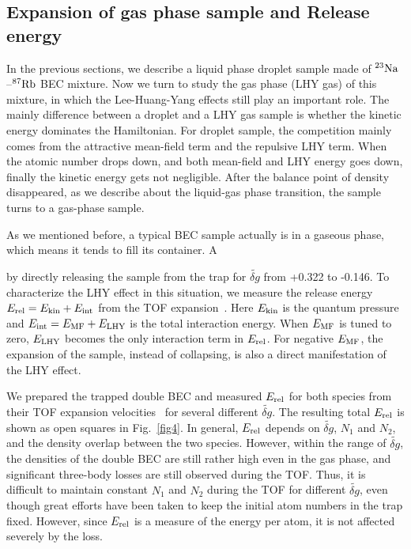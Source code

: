 \subsection{Expansion of gas phase sample and Release energy}
In the previous sections, we describe a liquid phase droplet sample made of $^{23}\rm Na$--$^{87}\rm Rb$ BEC mixture. 
Now we turn to study the gas phase (LHY gas) of this mixture, in which the Lee-Huang-Yang effects still play an important role.
The mainly difference between a droplet and a LHY gas sample is whether the kinetic energy dominates the Hamiltonian.
For droplet sample, the competition mainly comes from the attractive mean-field term and the repulsive LHY term.
When the atomic number drops down, and both mean-field and LHY energy goes down, finally the kinetic energy gets not negligible.
After the balance point of density disappeared, as we describe about the liquid-gas phase transition, the sample turns to a gas-phase sample.

As we mentioned before, a typical BEC sample actually is in a gaseous phase, which means it tends to fill its container.
A 


by directly releasing the sample from the trap for $\widetilde{\delta g}$ from +0.322 to -0.146.
To characterize the LHY effect in this situation, we measure the release energy $E_{\rm rel}=E_{\rm kin}+E_{\rm int}$ from the TOF expansion~\cite{Holland1997,Mewes1996}. Here $E_\text{\rm kin}$ is the quantum pressure and $E_{\rm int}=E_{\rm MF}+E_{\rm LHY}$ is the total interaction energy. When $E_{\rm MF}$ is tuned to zero, $E_{\rm LHY}$ becomes the only interaction term in $E_{\rm rel}$. For negative $E_{\rm MF}$, the expansion of the sample, instead of collapsing, is also a direct manifestation of the LHY effect. 

We prepared the trapped double BEC and measured $E_{\rm rel}$ for both species from their TOF expansion velocities~\cite{SM,Holland1997} for several different $\widetilde{\delta g}$. The resulting total $E_{\rm rel}$ is shown as open squares in Fig.~\ref{fig4}. In general, $E_{\rm rel}$ depends on $\widetilde{\delta g}$, $N_1$ and $N_2$, and the density overlap between the two species. However, within the range of $\widetilde{\delta g}$, the densities of the double BEC are still rather high even in the gas phase, and significant three-body losses are still observed during the TOF. Thus, it is difficult to maintain constant $N_1$ and $N_2$ during the TOF for different $\widetilde{\delta g}$, even though great efforts have been taken to keep the initial atom numbers in the trap fixed. However, since $E_{\rm rel}$ is a measure of the energy per atom, it is not affected severely by the loss. 

